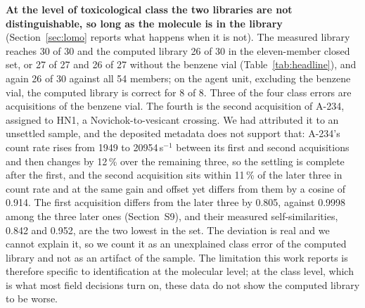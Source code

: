 \documentclass[review,12pt]{elsarticle}
\begin{document}
\textbf{At the level of toxicological class the two libraries are not distinguishable, so long as the molecule is in the library} (Section~\ref{sec:lomo} reports what happens when it is not). The measured library reaches 30 of 30 and the computed library 26 of 30 in the eleven-member closed set, or 27 of 27 and 26 of 27 without the benzene vial (Table~\ref{tab:headline}), and again 26 of 30 against all 54 members; on the agent unit, excluding the benzene vial, the computed library is correct for 8 of 8. Three of the four class errors are acquisitions of the benzene vial. The fourth is the second acquisition of A-234, assigned to HN1, a Novichok-to-vesicant crossing. We had attributed it to an unsettled sample, and the deposited metadata does not support that: A-234's count rate rises from 1949 to 20954\,s$^{-1}$ between its first and second acquisitions and then changes by 12\,\% over the remaining three, so the settling is complete after the first, and the second acquisition sits within 11\,\% of the later three in count rate and at the same gain and offset yet differs from them by a cosine of 0.914. The first acquisition differs from the later three by 0.805, against 0.9998 among the three later ones (Section~S9), and their measured self-similarities, 0.842 and 0.952, are the two lowest in the set. The deviation is real and we cannot explain it, so we count it as an unexplained class error of the computed library and not as an artifact of the sample. The limitation this work reports is therefore specific to identification at the molecular level; at the class level, which is what most field decisions turn on, these data do not show the computed library to be worse.
\end{document}
